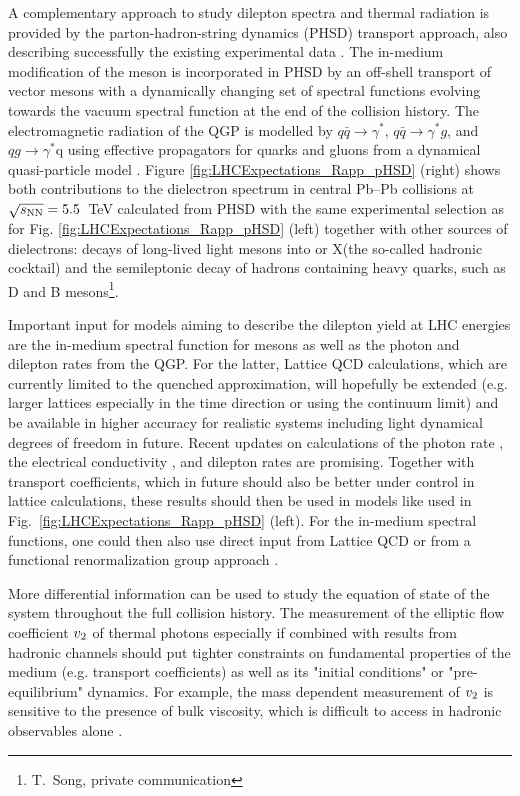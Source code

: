 \documentclass[../report.tex]{subfiles}
\begin{document}
A complementary approach to study dilepton spectra and thermal radiation is provided by the parton-hadron-string dynamics (PHSD) transport approach, also describing successfully the existing experimental data \cite{Linnyk:2015rco,Cassing:2009vt}. The in-medium modification of the \Prho meson is incorporated in PHSD by an off-shell transport of vector mesons with a dynamically changing set of spectral functions \cite{Bratkovskaya:2007jk} evolving towards the vacuum spectral function at the end of the collision history. The electromagnetic radiation of the QGP is modelled by $q\bar{q}\rightarrow\gamma^{*}$, $q\bar{q}\rightarrow\gamma^{*}g$, and $qg\rightarrow\gamma^{*}$q using effective propagators for quarks and gluons from a dynamical quasi-particle model \cite{Linnyk:2010vb}. Figure \ref{fig:LHCExpectations_Rapp_pHSD} (right) shows both contributions to the dielectron spectrum in central Pb--Pb collisions at $\sqrt{s_{\rm NN}}= 5.5$~TeV calculated from PHSD with the same experimental selection as for Fig. \ref{fig:LHCExpectations_Rapp_pHSD} (left) together with other sources of dielectrons: decays of long-lived light mesons into \Pepem or X\Pepem (the so-called hadronic cocktail) and the semileptonic decay of hadrons containing heavy quarks, such as D and B mesons\footnote{T.~Song, private communication}. 

Important input for models aiming to describe the dilepton yield at LHC energies are the in-medium spectral function for \Prho mesons as well as the photon and dilepton rates from the QGP. For the latter, Lattice QCD calculations, which are currently limited to the quenched approximation, will hopefully be extended (e.g. larger lattices especially in the time direction or using the continuum limit) and be available in higher accuracy for realistic systems including light dynamical degrees of freedom in future. Recent updates on calculations of the photon rate \cite{Ghiglieri:2016tvj}, the electrical conductivity \cite{Aarts:2014nba}, and dilepton rates \cite{Ding:2016hua} are promising. Together with transport coefficients, which in future should also be better under control in lattice calculations, these results should then be used in models like used in Fig.~\ref{fig:LHCExpectations_Rapp_pHSD} (left). For the in-medium spectral functions, one could then also use direct input from Lattice QCD \cite{Aarts:2005hg,Brandt:2015aqk} or from a functional renormalization group approach \cite{Jung:2016yxl}.

More differential information can be used to study the equation of state of the system throughout the full collision history. The measurement of the elliptic flow coefficient $v_{\rm 2}$ of thermal photons especially if combined with results from hadronic channels should put tighter constraints on fundamental properties of the medium (e.g. transport coefficients) as well as its "initial conditions" or "pre-equilibrium" dynamics. For example, the mass dependent measurement of  $v_{\rm 2}$ is sensitive to the presence of bulk viscosity, which is difficult to access in hadronic observables alone \cite{Vujanovic:2017wtw}. 
\end{document}
